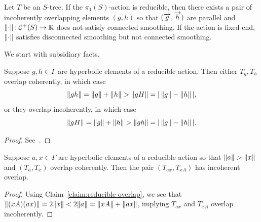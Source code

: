\begin{lemma}
\label{lem:red_not_smoothing}
Let $T$ be an $S$-tree.
If the $\pi_1(S)$-action is reducible,
then there exists a pair of incoherently overlapping elements $(g,h)$ so that
$(\overrightarrow{g},\overrightarrow{h})$ are parallel and $\lVert\cdot\rVert \colon \mathcal{C}^+(S) \to \mathbb{R}$ does not
satisfy connected smoothing.
If the
action is fixed-end, $\lVert\cdot\rVert$
satisfies disconnected smoothing but not connected smoothing.
\end{lemma}

We start with subsidiary facts.

\begin{claim}\label{claim:reducible-overlap}
  Suppose $g,h \in \Gamma$ are hyperbolic elements of a reducible action. Then
 either $T_g,T_h$ overlap coherently, in which case
\begin{equation}
\lVert gh \rVert=\lVert g \rVert + \lVert h \rVert > \lVert gH \rVert = |\,\lVert g \rVert- \lVert h \rVert\, |,
\label{eq:reducible1}
\end{equation}
or they overlap incoherently, in which case
\begin{equation}
\lVert gH \rVert =\lVert g\rVert + \lVert h \rVert > \lVert gh \rVert = |\, \lVert g \rVert - \lVert h \rVert\,|.
\label{eq:reducible2}
\end{equation}
\end{claim}
\begin{proof}
See~\cite[Lemma~6.4]{CM87:GroupActions}.
\end{proof}

\begin{claim}\label{claim:incoherent}
  Suppose $a,x \in \Gamma$ are hyperbolic elements of a
  reducible action so that $\lVert a \rVert>\lVert x \rVert$ and $(T_a,T_x)$ overlap
  coherently. Then the pair $(T_{ax},T_{xA})$ has incoherent overlap.
\end{claim}
\begin{proof}
  Using Claim~\ref{claim:reducible-overlap}, we see that
  $\lVert(xA)(ax)\rVert = 2\lVert x\rVert < 2\lVert a\rVert = \lVert xA\rVert + \lVert ax\rVert$,
  implying $T_{ax}$ and $T_{xA}$ overlap incoherently.
\end{proof}

